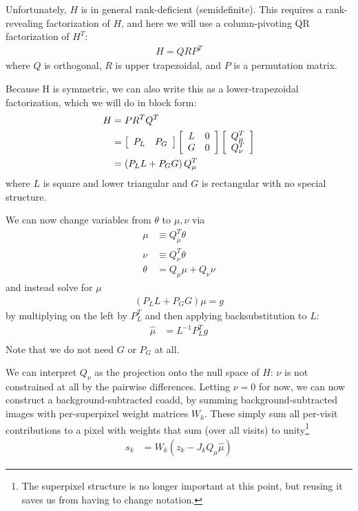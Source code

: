 \documentclass[DM,lsstdraft,authoryear,toc]{lsstdoc}
\begin{document}
Unfortunately, $H$ is in general rank-deficient (semidefinite).
This requires a rank-revealing factorization of $H$, and here we will use a column-pivoting QR factorization of $H^T$:
\begin{align}
	H = Q R P^T
\end{align}
where $Q$ is orthogonal, $R$ is upper trapezoidal, and $P$ is a permutation matrix.

Because H is symmetric, we can also write this as a lower-trapezoidal factorization, which we will do in block form:
\begin{align}
	H & = P R^T Q^T \\
	  & =
	\left[
		\begin{array}{c c}
			P_L & P_G
		\end{array}
		\right]
	\left[
		\begin{array}{c c}
			L & 0 \\
			G & 0
		\end{array}
		\right]
	\left[
		\begin{array}{c}
			Q_\mu^T \\
			Q_\nu^T
		\end{array}
	\right]         \\
	  & =
	\left(P_L L + P_G G\right) Q_\mu^T
\end{align}
where $L$ is square and lower triangular and $G$ is rectangular with no special structure.

We can now change variables from $\theta$ to $\mu, \nu$ via
\begin{align}
	\mu    & \equiv Q_\mu^T \theta   \\
	\nu    & \equiv Q_\nu^T \theta   \\
	\theta & = Q_\mu \mu + Q_\nu \nu
\end{align}
and instead solve for $\mu$
\begin{align}
	\left(P_L L + P_G G\right)\mu = g
\end{align}
by multiplying on the left by $P_L^T$ and then applying backsubstitution to $L$:
\begin{align}
	\hat{\mu} & = L^{-1} P_L^T g \\
\end{align}
Note that we do not need $G$ or $P_G$ at all.

We can interpret $Q_\nu$ as the projection onto the null space of $H$: $\nu$ is not constrained at all by the pairwise differences.
Letting $\nu = 0$ for now, we can now construct a background-subtracted coadd, by summing background-subtracted images with per-superpixel weight matrices $W_k$.
These simply sum all per-visit contributions to a pixel with weights that sum (over all visits) to unity\footnote{The superpixel structure is no longer important at this point, but reusing it saves us from having to change notation.}
\begin{align}
	s_k & = W_k \left( z_k - J_k Q_\mu \hat{\mu} \right)
\end{align}
\end{document}
